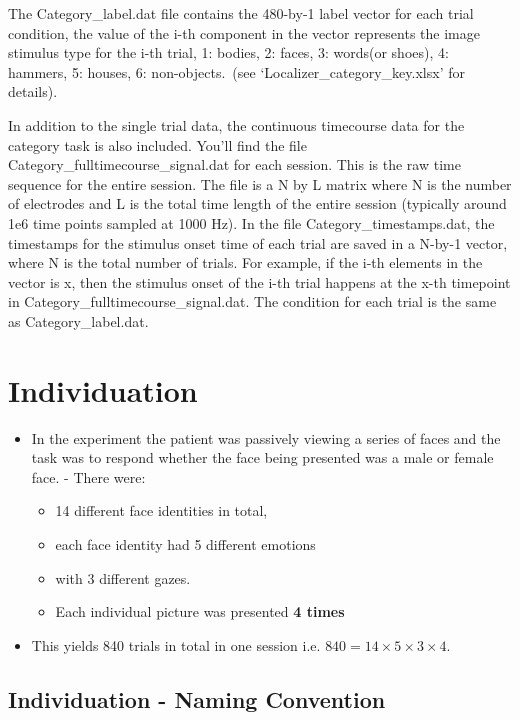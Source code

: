 \documentclass[11pt]{article}
\begin{document}
The Category\_label.dat file contains the 480-by-1 label vector for each trial condition, the value of the i-th component in the vector represents the image stimulus type for the i-th trial, 1: bodies, 2: faces, 3: words(or shoes), 4: hammers, 5: houses, 6: non-objects. (see ‘Localizer\_category\_key.xlsx’ for details).

In addition to the single trial data, the continuous timecourse data for the category task is also included. You’ll find the file Category\_fulltimecourse\_signal.dat for each session. This is the raw time sequence for the entire session. The file is a N by L matrix where N is the number of electrodes and L is the total time length of the entire session (typically around 1e6 time points sampled at 1000 Hz). In the file Category\_timestamps.dat, the timestamps for the stimulus onset time of each trial are saved in a N-by-1 vector, where N is the total number of trials. For example, if the i-th elements in the vector is x, then the stimulus onset of the i-th trial happens at the x-th timepoint in Category\_fulltimecourse\_signal.dat. The condition for each trial is the same as Category\_label.dat.

\section{Individuation}
\label{sec:orgb8c8cd0}

\begin{itemize}
\item In the experiment the patient was passively viewing a series of faces and the task was to respond whether the face being presented was a male or female face.  - There were:
\begin{itemize}
\item 14 different face identities in total,
\item each face identity had 5 different emotions
\item with 3 different gazes.
\item Each individual picture was presented \textbf{4 times}
\end{itemize}
\item This yields 840 trials in total in one session i.e. \(840 = 14 \times 5 \times 3 \times 4\).
\end{itemize}

\subsection{Individuation - Naming Convention}
\label{sec:orgaec1d3e}
\end{document}
